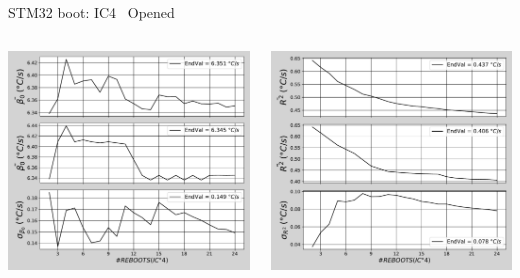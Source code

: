 \begin{frame}{STM32 boot: IC4 \textrightarrow\ Opened}
	\vspace{5mm}
	\begin{columns}
		\begin{column}{0.5\textwidth}
			\includegraphics[width=1.0\textwidth]{./figures/flistCircuit4_25_sl30beta0.pdf}
		\end{column}
		\begin{column}{0.5\textwidth}
			\includegraphics[width=1.0\textwidth]{./figures/flistCircuit4_25_sl30r2.pdf}
		\end{column}
	\end{columns}
\end{frame}

